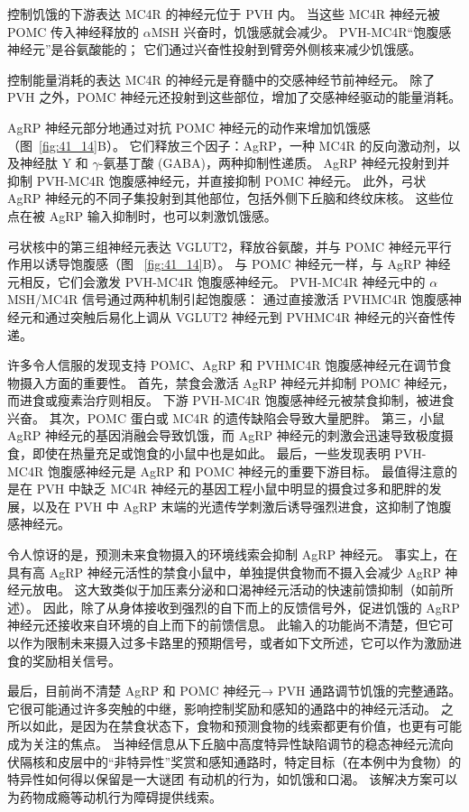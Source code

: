 控制饥饿的下游表达 MC4R 的神经元位于 PVH 内。
当这些 MC4R 神经元被 POMC 传入神经释放的 $\alpha$MSH 兴奋时，饥饿感就会减少。
PVH-MC4R“饱腹感神经元”是谷氨酸能的；
它们通过兴奋性投射到臂旁外侧核来减少饥饿感。


控制能量消耗的表达 MC4R 的神经元是脊髓中的交感神经节前神经元。
除了 PVH 之外，POMC 神经元还投射到这些部位，增加了交感神经驱动的能量消耗。


AgRP 神经元部分地通过对抗 POMC 神经元的动作来增加饥饿感（图~\ref{fig:41_14}B）。
它们释放三个因子：AgRP，一种 MC4R 的反向激动剂，以及神经肽 Y 和 $ \gamma $-氨基丁酸 (GABA)，两种抑制性递质。
AgRP 神经元投射到并抑制 PVH-MC4R 饱腹感神经元，并直接抑制 POMC 神经元。
此外，弓状 AgRP 神经元的不同子集投射到其他部位，包括外侧下丘脑和终纹床核。
这些位点在被 AgRP 输入抑制时，也可以刺激饥饿感。


弓状核中的第三组神经元表达 VGLUT2，释放谷氨酸，并与 POMC 神经元平行作用以诱导饱腹感（图 ~\ref{fig:41_14}B）。
与 POMC 神经元一样，与 AgRP 神经元相反，它们会激发 PVH-MC4R 饱腹感神经元。
PVH-MC4R 神经元中的 $\alpha$MSH/MC4R 信号通过两种机制引起饱腹感：
通过直接激活 PVHMC4R 饱腹感神经元和通过突触后易化上调从 VGLUT2 神经元到 PVHMC4R 神经元的兴奋性传递。


许多令人信服的发现支持 POMC、AgRP 和 PVHMC4R 饱腹感神经元在调节食物摄入方面的重要性。
首先，禁食会激活 AgRP 神经元并抑制 POMC 神经元，而进食或瘦素治疗则相反。
下游 PVH-MC4R 饱腹感神经元被禁食抑制，被进食兴奋。
其次，POMC 蛋白或 MC4R 的遗传缺陷会导致大量肥胖。
第三，小鼠 AgRP 神经元的基因消融会导致饥饿，而 AgRP 神经元的刺激会迅速导致极度摄食，即使在热量充足或饱食的小鼠中也是如此。
最后，一些发现表明 PVH-MC4R 饱腹感神经元是 AgRP 和 POMC 神经元的重要下游目标。
最值得注意的是在 PVH 中缺乏 MC4R 神经元的基因工程小鼠中明显的摄食过多和肥胖的发展，以及在 PVH 中 AgRP 末端的光遗传学刺激后诱导强烈进食，这抑制了饱腹感神经元。


令人惊讶的是，预测未来食物摄入的环境线索会抑制 AgRP 神经元。
事实上，在具有高 AgRP 神经元活性的禁食小鼠中，单独提供食物而不摄入会减少 AgRP 神经元放电。
这大致类似于加压素分泌和口渴神经元活动的快速前馈抑制（如前所述）。
因此，除了从身体接收到强烈的自下而上的反馈信号外，促进饥饿的 AgRP 神经元还接收来自环境的自上而下的前馈信息。
此输入的功能尚不清楚，但它可以作为限制未来摄入过多卡路里的预期信号，或者如下文所述，它可以作为激励进食的奖励相关信号。


最后，目前尚不清楚 AgRP 和 POMC 神经元→ PVH 通路调节饥饿的完整通路。
它很可能通过许多突触的中继，影响控制奖励和感知的通路中的神经元活动。
之所以如此，是因为在禁食状态下，食物和预测食物的线索都更有价值，也更有可能成为关注的焦点。
当神经信息从下丘脑中高度特异性缺陷调节的稳态神经元流向伏隔核和皮层中的“非特异性”奖赏和感知通路时，特定目标（在本例中为食物）的特异性如何得以保留是一大谜团 有动机的行为，如饥饿和口渴。
该解决方案可以为药物成瘾等动机行为障碍提供线索。


